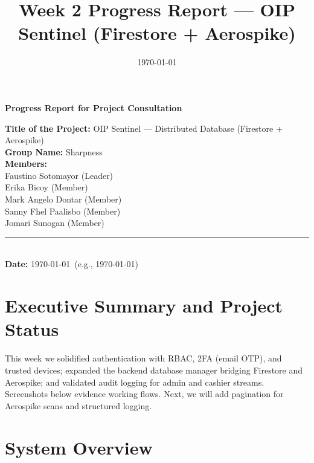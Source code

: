\documentclass[12pt]{article}
\title{Week 2 Progress Report — OIP Sentinel (Firestore + Aerospike)}
\author{}
\date{\today}
\begin{document}
\begin{center}
\Large\textbf{Progress Report for Project Consultation}
\end{center}

\noindent\makebox[\textwidth]{\rule{0.92\textwidth}{0.8pt}}
\vspace{0.6em}

\vspace{0.5em}
\begin{flushleft}
\textbf{Title of the Project:} OIP Sentinel — Distributed Database (Firestore + Aerospike)\\
\textbf{Group Name:} Sharpness\\[0.6em]
\textbf{Members:}\\
Faustino Sotomayor (Leader)\\
Erika Bicoy (Member)\\
Mark Angelo Dontar (Member)\\
Sanny Fhel Paalisbo (Member)\\
Jomari Sunogan (Member)\\[0.6em]
\noindent\rule{\textwidth}{0.4pt}\\[0.4em]
\textbf{Date:} \today\ (e.g., \today)
\end{flushleft}
\vspace{0.5em}

\section{Executive Summary and Project Status}
This week we solidified authentication with RBAC, 2FA (email OTP), and trusted devices; expanded the backend database manager bridging Firestore and Aerospike; and validated audit logging for admin and cashier streams. Screenshots below evidence working flows. Next, we will add pagination for Aerospike scans and structured logging.

\section{System Overview}
\end{document}
